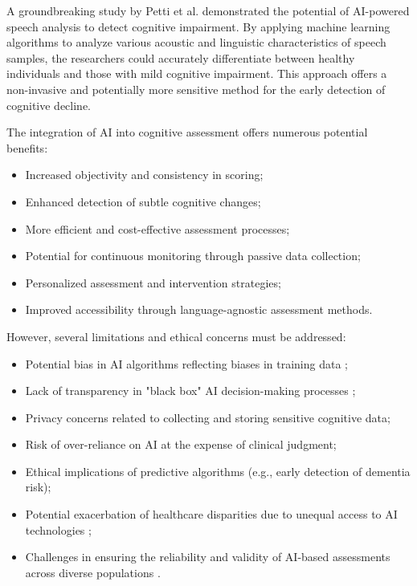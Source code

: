 A groundbreaking study by Petti et al. \cite{Petti2020} demonstrated the potential of AI-powered speech analysis to detect cognitive impairment. By applying machine learning algorithms to analyze various acoustic and linguistic characteristics of speech samples, the researchers could accurately differentiate between healthy individuals and those with mild cognitive impairment. This approach offers a non-invasive and potentially more sensitive method for the early detection of cognitive decline.

The integration of AI into cognitive assessment offers numerous potential benefits:
\begin{itemize}
    \item Increased objectivity and consistency in scoring;
    \item Enhanced detection of subtle cognitive changes;
    \item More efficient and cost-effective assessment processes;
    \item Potential for continuous monitoring through passive data collection;
    \item Personalized assessment and intervention strategies;
    \item Improved accessibility through language-agnostic assessment methods.
\end{itemize}

However, several limitations and ethical concerns must be addressed:
\begin{itemize}
    \item Potential bias in AI algorithms reflecting biases in training data \cite{Birhane2021};
    \item Lack of transparency in "black box" AI decision-making processes \cite{Rudin2019};
    \item Privacy concerns related to collecting and storing sensitive cognitive data;
    \item Risk of over-reliance on AI at the expense of clinical judgment;
    \item Ethical implications of predictive algorithms (e.g., early detection of dementia risk);
    \item Potential exacerbation of healthcare disparities due to unequal access to AI technologies \cite{Obermeyer2019};
    \item Challenges in ensuring the reliability and validity of AI-based assessments across diverse populations \cite{Gianfrancesco2018}.
\end{itemize}

